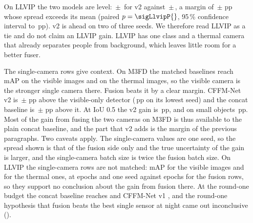 On LLVIP the two models are level: \resLlvipCffmVtwoMeanMap{}\,$\pm$\,\resLlvipCffmVtwoStdMap{} for v2 against \resLlvipConcatMdMeanMap{}\,$\pm$\,\resLlvipConcatMdStdMap{}, a margin of \marLlvipVtwoVsConcatMdMeanMap{}\,$\pm$\,\marLlvipVtwoVsConcatMdStdMap{}\,pp whose spread exceeds its mean (paired $p=\sigLlvipP{}$, 95\,\% confidence interval \sigLlvipCiLow{} to \sigLlvipCiHigh{}\,pp). v2 is ahead on two of three seeds. We therefore read LLVIP as a tie and do not claim an LLVIP gain. LLVIP has one class and a thermal camera that already separates people from background, which leaves little room for a better fuser.

The single-camera rows give context. On M3FD the matched baselines reach \resMfdYoloVisSeedZeroMap{} mAP on the visible images and \resMfdYoloThmSeedZeroMap{} on the thermal images, so the visible camera is the stronger single camera there. Fusion beats it by a clear margin. CFFM-Net v2 is \gainMfdCffmVtwoOverBestMeanMap{}\,$\pm$\,\gainMfdCffmVtwoOverBestStdMap{}\,pp above the visible-only detector (\gainMfdCffmVtwoOverBestMinMap{}\,pp on its lowest seed) and the concat baseline is \gainMfdConcatMdOverBestMeanMap{}\,$\pm$\,\gainMfdConcatMdOverBestStdMap{}\,pp above it. At IoU 0.5 the v2 gain is \gainMfdCffmVtwoOverBestMapFiftyMean{}\,pp, and on small objects \gainMfdCffmVtwoOverBestApSmallMean{}\,pp. Most of the gain from fusing the two cameras on M3FD is thus available to the plain concat baseline, and the part that v2 adds is the margin of the previous paragraphs. Two caveats apply. The single-camera values are one seed, so the spread shown is that of the fusion side only and the true uncertainty of the gain is larger, and the single-camera batch size is twice the fusion batch size. On LLVIP the single-camera rows are not matched: \resLlvipYoloVisSeedZeroMap{} mAP for the visible images and \resLlvipYoloThmSeedZeroMap{} for the thermal ones, at \cfgEpochsPilot{} epochs and one seed against \cfgEpochs{} epochs for the fusion rows, so they support no conclusion about the gain from fusion there. At the round-one budget the concat baseline reaches \resLlvipConcatPlainSeedZeroMap{} and CFFM-Net v1 \resLlvipCffmVoneSeedZeroMap{}, and the round-one hypothesis that fusion beats the best single sensor at night came out inconclusive (\hypPhOneEvidence{}).



